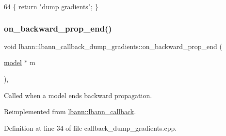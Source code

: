\begin{DoxyCode}
64 \{ \textcolor{keywordflow}{return} \textcolor{stringliteral}{"dump gradients"}; \}
\end{DoxyCode}
\mbox{\label{classlbann_1_1lbann__callback__dump__gradients_a2485599f66842eda62c8bc8d4d44ef02}} 
\subsubsection{\texorpdfstring{on\+\_\+backward\+\_\+prop\+\_\+end()}{on\_backward\_prop\_end()}}
{\footnotesize\ttfamily void lbann\+::lbann\+\_\+callback\+\_\+dump\+\_\+gradients\+::on\+\_\+backward\+\_\+prop\+\_\+end (\begin{DoxyParamCaption}\item[{\hyperlink{classlbann_1_1model}{model} $\ast$}]{m }\end{DoxyParamCaption})\hspace{0.3cm}{\ttfamily [override]}, {\ttfamily [virtual]}}

Called when a model ends backward propagation. 

Reimplemented from \hyperlink{classlbann_1_1lbann__callback_af183624e63ba65e0003fa988f53dee0c}{lbann\+::lbann\+\_\+callback}.



Definition at line 34 of file callback\+\_\+dump\+\_\+gradients.\+cpp.


